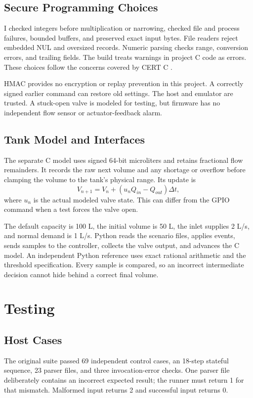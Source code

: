 \documentclass[conference]{IEEEtran}
\begin{document}
\subsection{Secure Programming Choices}
I checked integers before multiplication or narrowing, checked file and process failures, bounded buffers, and preserved exact input bytes. File readers reject embedded NUL and oversized records. Numeric parsing checks range, conversion errors, and trailing fields. The build treats warnings in project C code as errors. These choices follow the concerns covered by CERT C \cite{cert}.

HMAC provides no encryption or replay prevention in this project. A correctly signed earlier command can restore old settings. The host and emulator are trusted. A stuck-open valve is modeled for testing, but firmware has no independent flow sensor or actuator-feedback alarm.

\subsection{Tank Model and Interfaces}
The separate C model uses signed 64-bit microliters and retains fractional flow remainders. It records the raw next volume and any shortage or overflow before clamping the volume to the tank's physical range. Its update is
\begin{equation}
V_{n+1}=V_n+(u_nQ_{in}-Q_{out})\Delta t,
\end{equation}
where $u_n$ is the actual modeled valve state. This can differ from the GPIO command when a test forces the valve open.

The default capacity is 100 L, the initial volume is 50 L, the inlet supplies 2 L/s, and normal demand is 1 L/s. Python reads the scenario files, applies events, sends samples to the controller, collects the valve output, and advances the C model. An independent Python reference uses exact rational arithmetic and the threshold specification. Every sample is compared, so an incorrect intermediate decision cannot hide behind a correct final volume.

\section{Testing}
\subsection{Host Cases}
The original suite passed 69 independent control cases, an 18-step stateful sequence, 23 parser files, and three invocation-error checks. One parser file deliberately contains an incorrect expected result; the runner must return 1 for that mismatch. Malformed input returns 2 and successful input returns 0.
\end{document}
